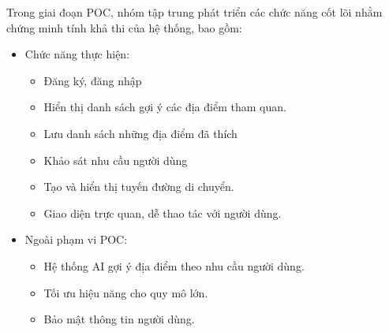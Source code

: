\quad Trong giai đoạn POC, nhóm tập trung phát triển các chức năng cốt lõi nhằm chứng minh tính khả thi của hệ thống, bao gồm:
\begin{itemize}
    \item Chức năng thực hiện:
    \begin{itemize}
        \item Đăng ký, đăng nhập
        \item Hiển thị danh sách gợi ý các địa điểm tham quan.
        \item Lưu danh sách những địa điểm đã thích
        \item Khảo sát nhu cầu người dùng
        \item Tạo và hiển thị tuyến đường di chuyển.
        \item Giao diện trực quan, dễ thao tác với người dùng.
    \end{itemize}

    \item Ngoài phạm vi POC:
    \begin{itemize}
        \item Hệ thống AI gợi ý địa điểm theo nhu cầu người dùng.
        \item Tối ưu hiệu năng cho quy mô lớn.
        \item Bảo mật thông tin người dùng.
    \end{itemize}
\end{itemize}